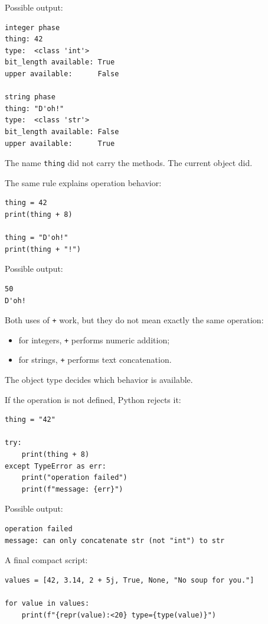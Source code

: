 Possible output:

\begin{verbatim}
integer phase
thing: 42
type:  <class 'int'>
bit_length available: True
upper available:      False

string phase
thing: "D'oh!"
type:  <class 'str'>
bit_length available: False
upper available:      True
\end{verbatim}

The name \texttt{thing} did not carry the methods. The current object did.

The same rule explains operation behavior:

\begin{verbatim}
thing = 42
print(thing + 8)

thing = "D'oh!"
print(thing + "!")
\end{verbatim}

Possible output:

\begin{verbatim}
50
D'oh!
\end{verbatim}

Both uses of \texttt{+} work, but they do not mean exactly the same operation:

\begin{itemize}
    \item for integers, \texttt{+} performs numeric addition;
    \item for strings, \texttt{+} performs text concatenation.
\end{itemize}

The object type decides which behavior is available.

If the operation is not defined, Python rejects it:

\begin{verbatim}
thing = "42"

try:
    print(thing + 8)
except TypeError as err:
    print("operation failed")
    print(f"message: {err}")
\end{verbatim}

Possible output:

\begin{verbatim}
operation failed
message: can only concatenate str (not "int") to str
\end{verbatim}

A final compact script:

\begin{verbatim}
values = [42, 3.14, 2 + 5j, True, None, "No soup for you."]

for value in values:
    print(f"{repr(value):<20} type={type(value)}")
\end{verbatim}

